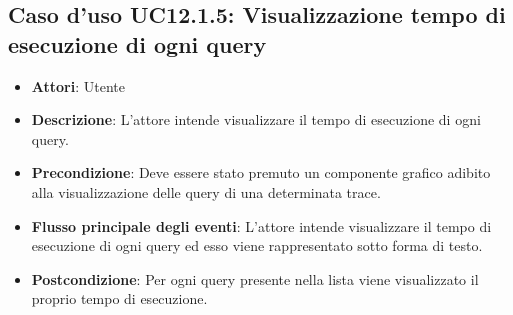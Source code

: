 \subsection{Caso d'uso UC12.1.5: Visualizzazione tempo di esecuzione di ogni query}
\begin{itemize}
	\item \textbf{Attori}: Utente
	\item \textbf{Descrizione}: L'attore intende visualizzare il tempo di esecuzione di ogni query.
	\item \textbf{Precondizione}: Deve essere stato premuto un componente grafico adibito alla visualizzazione delle query di una determinata trace.
	\item \textbf{Flusso principale degli eventi}: L'attore intende visualizzare il tempo di esecuzione di ogni query ed esso viene rappresentato sotto forma di testo.
	\item \textbf{Postcondizione}: Per ogni query presente nella lista viene visualizzato il proprio tempo di esecuzione.
\end{itemize}
